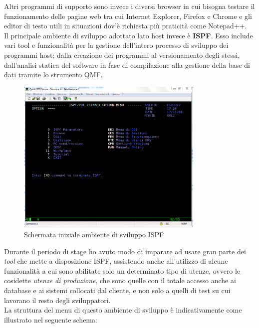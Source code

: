 	Altri programmi di supporto sono invece i diversi browser in cui bisogna testare il funzionamento delle pagine web tra cui Internet Explorer, Firefox e Chrome e gli editor di testo utili in situazioni dov'è richiesta più praticità come Notepad++.\\

	Il principale ambiente di sviluppo adottato lato host invece è \textbf{ISPF}\glossario. Esso include vari tool e funzionalità per la gestione dell'intero processo di sviluppo dei programmi host; dalla creazione dei programmi al versionamento degli stessi, dall'analisi statica del software in fase di compilazione alla gestione della base di dati tramite lo strumento QMF\glossario.

	\begin{figure}[H]
		\centering
	   	\includegraphics[width=0.80\textwidth]{immagini/ISPF}
	   	\caption{Schermata iniziale ambiente di sviluppo ISPF}
	\end{figure}

	Durante il periodo di stage ho avuto modo di imparare ad usare gran parte dei \textit{tool} che mette a disposizione ISPF, assistendo anche all'utilizzo di alcune funzionalità a cui sono abilitate solo un determinato tipo di utenze, ovvero le cosidette \textit{utenze di produzione}, che sono quelle con il totale accesso anche ai database e ai sistemi collocati dal cliente, e non solo a quelli di test su cui lavorano il resto degli sviluppatori.\\
	
	La struttura del menu di questo ambiente di sviluppo è indicativamente come illustrato nel seguente schema:
	
